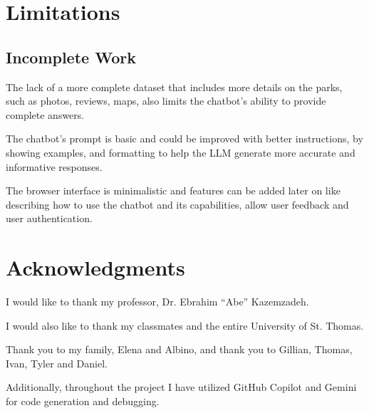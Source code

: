 \documentclass[11pt]{article}
\begin{document}
\section{Limitations}

\subsection{Incomplete Work}
The lack of a more complete dataset that includes more details on the parks, such as photos, reviews, maps, also limits the chatbot's ability to provide complete answers.

The chatbot's prompt is basic and could be improved with better instructions, by showing examples, and formatting to help the LLM generate more accurate and informative responses.

The browser interface is minimalistic and features can be added later on like describing how to use the chatbot and its capabilities, allow user feedback and user authentication.

\section*{Acknowledgments}
I would like to thank my professor, Dr. Ebrahim “Abe” Kazemzadeh.

I would also like to thank my classmates and the entire University of St. Thomas. 

Thank you to my family, Elena and Albino, and thank you to Gillian, Thomas, Ivan, Tyler and Daniel.

Additionally, throughout the project I have utilized GitHub Copilot and Gemini for code generation and debugging.

%
\end{document}
